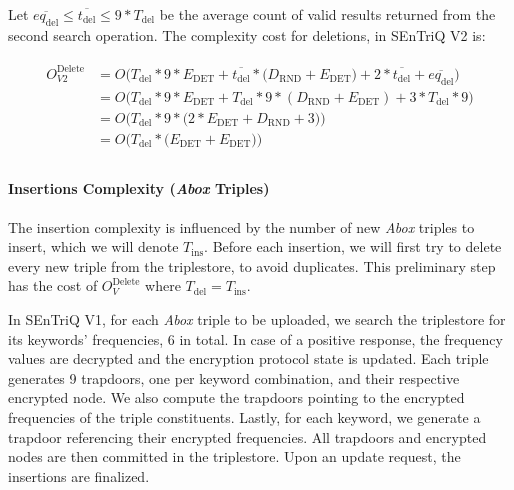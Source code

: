 Let $\overline{eq_{\text{del}}} \leq \overline{t_{\text{del}}} \leq 9 * T_{\text{del}}$ be the average count of valid results returned from the second search operation. The complexity cost for deletions, in \gls{SEnTriQ} V2 is:

\begin{align}
    \label{equation:update-delete-v2-complexity}
    \begin{split}
        O^{\text{Delete}}_{V2} &=
        O\Big(
            T_{\text{del}} * 9 * E_{\text{DET}}
            + \overline{t_{\text{del}}} * \big(D_{\text{RND}} +  E_{\text{DET}}\big)             
            + 2 * \overline{t_{\text{del}}} + \overline{eq_{\text{del}}}
        \Big) \\
        &= O\Big(
            T_{\text{del}} * 9 * E_{\text{DET}}
            + T_{\text{del}} * 9 * (D_{\text{RND}} +  E_{\text{DET}})             
            + 3 * T_{\text{del}} * 9
        \Big) \\
        &= O\Big(
            T_{\text{del}} * 9 * \big( 2 * E_{\text{DET}} + D_{\text{RND}} +  3 \big)\Big) \\
        &= O\Big(T_{\text{del}} * \big(E_{\text{DET}} + E_{\text{DET}}\big)\Big) \\
    \end{split}
\end{align}

\paragraph{Insertions Complexity (\emph{Abox} Triples)}

The insertion complexity is influenced by the number of new \emph{Abox} triples to insert, which we will denote $T_{\text{ins}}$. Before each insertion, we will first try to delete every new triple from the triplestore, to avoid duplicates. This preliminary step has the cost of $O^{\text{Delete}}_V$ where $T_{\text{del}} = T_{\text{ins}}$.

In \gls{SEnTriQ} V1, for each \emph{Abox} triple to be uploaded, we search the triplestore for its keywords' frequencies, 6 in total. In case of a positive response, the frequency values are decrypted and the encryption protocol state is updated. Each triple generates 9 trapdoors, one per keyword
combination, and their respective encrypted node. We also compute the trapdoors pointing to the encrypted frequencies of the triple constituents. Lastly, for each keyword, we generate a trapdoor referencing their encrypted frequencies. All trapdoors and encrypted nodes are then committed in the triplestore. Upon an update request, the insertions are finalized.

